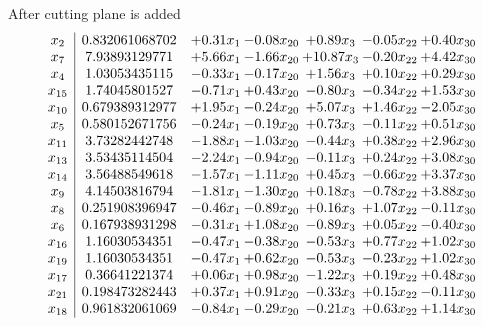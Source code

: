 \documentclass[8pt]{article}
\begin{document}
 After cutting plane is added 
\[\begin{array}{c| c c@{\hskip 2pt} c@{\hskip 2pt} c@{\hskip 2pt} c@{\hskip 2pt} c@{\hskip 2pt} }
 x_{2}   &  0.832061068702 & +  0.31 x_{1} & -0.08 x_{20} & +  0.89 x_{3} & -0.05 x_{22} & +  0.40 x_{30}\\
 x_{7}   &  7.93893129771 & +  5.66 x_{1} & -1.66 x_{20} & + 10.87 x_{3} & -0.20 x_{22} & +  4.42 x_{30}\\
 x_{4}   &  1.03053435115 & -0.33 x_{1} & -0.17 x_{20} & +  1.56 x_{3} & +  0.10 x_{22} & +  0.29 x_{30}\\
 x_{15}   &  1.74045801527 & -0.71 x_{1} & +  0.43 x_{20} & -0.80 x_{3} & -0.34 x_{22} & +  1.53 x_{30}\\
 x_{10}   &  0.679389312977 & +  1.95 x_{1} & -0.24 x_{20} & +  5.07 x_{3} & +  1.46 x_{22} & -2.05 x_{30}\\
 x_{5}   &  0.580152671756 & -0.24 x_{1} & -0.19 x_{20} & +  0.73 x_{3} & -0.11 x_{22} & +  0.51 x_{30}\\
 x_{11}   &  3.73282442748 & -1.88 x_{1} & -1.03 x_{20} & -0.44 x_{3} & +  0.38 x_{22} & +  2.96 x_{30}\\
 x_{13}   &  3.53435114504 & -2.24 x_{1} & -0.94 x_{20} & -0.11 x_{3} & +  0.24 x_{22} & +  3.08 x_{30}\\
 x_{14}   &  3.56488549618 & -1.57 x_{1} & -1.11 x_{20} & +  0.45 x_{3} & -0.66 x_{22} & +  3.37 x_{30}\\
 x_{9}   &  4.14503816794 & -1.81 x_{1} & -1.30 x_{20} & +  0.18 x_{3} & -0.78 x_{22} & +  3.88 x_{30}\\
 x_{8}   &  0.251908396947 & -0.46 x_{1} & -0.89 x_{20} & +  0.16 x_{3} & +  1.07 x_{22} & -0.11 x_{30}\\
 x_{6}   &  0.167938931298 & -0.31 x_{1} & +  1.08 x_{20} & -0.89 x_{3} & +  0.05 x_{22} & -0.40 x_{30}\\
 x_{16}   &  1.16030534351 & -0.47 x_{1} & -0.38 x_{20} & -0.53 x_{3} & +  0.77 x_{22} & +  1.02 x_{30}\\
 x_{19}   &  1.16030534351 & -0.47 x_{1} & +  0.62 x_{20} & -0.53 x_{3} & -0.23 x_{22} & +  1.02 x_{30}\\
 x_{17}   &  0.36641221374 & +  0.06 x_{1} & +  0.98 x_{20} & -1.22 x_{3} & +  0.19 x_{22} & +  0.48 x_{30}\\
 x_{21}   &  0.198473282443 & +  0.37 x_{1} & +  0.91 x_{20} & -0.33 x_{3} & +  0.15 x_{22} & -0.11 x_{30}\\
 x_{18}   &  0.961832061069 & -0.84 x_{1} & -0.29 x_{20} & -0.21 x_{3} & +  0.63 x_{22} & +  1.14 x_{30}\\

\end{array}\]
\end{document}
